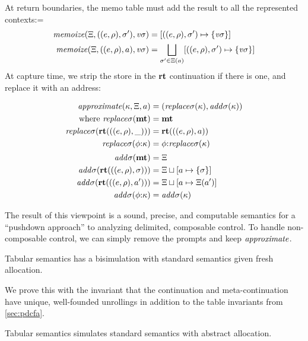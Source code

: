 At return boundaries, the memo table must add the result to all the represented contexts:=
\begin{align*}
  \mathit{memoize}(\Xi, ((e,\rho), \sigma'), \mathit{v\sigma}) &=
  [((e,\rho), \sigma') \mapsto \{ {\mathit{v\sigma}} \}] \\
  \mathit{memoize}(\Xi, ((e,\rho), a), \mathit{v\sigma}) &=
  \bigsqcup\limits_{\sigma' \in \Xi(a)}[((e,\rho), \sigma') \mapsto \{ \mathit{v\sigma} \}]
\end{align*}
At capture time, we strip the store in the $\mathbf{rt}$ continuation if there is one, and replace it with an address:

\newcommand{\replacectx}{\mathit{replace}\mstore}
\newcommand{\addstore}{\mathit{add}\mstore}
\begin{align*}
  \approximate(\mkont, \mktab, \maddr) &= (\replacectx(\mkont), \addstore(\mkont)) \\
  \text{where }
   \replacectx(\kmt) &= \kmt \\
   \replacectx(\krt{((\mexpr,\menv),\_)}) &= \krt{((\mexpr,\menv),\maddr)} \\
   \replacectx(\kcons{\mkframe}{\mkont}) &= \kcons{\mkframe}{\replacectx(\mkont)}
  \\[2pt]
   \addstore(\kmt) &= \mktab \\
   \addstore(\krt{((\mexpr,\menv),\mstore)}) &= \joinone{\mktab}{\maddr}{\mstore} \\
   \addstore(\krt{((\mexpr,\menv),\maddr')}) &= \joinm{\mktab}{\maddr}{\mktab(\maddr')} \\
   \addstore(\kcons{\mkframe}{\mkont}) &= \addstore(\mkont)
\end{align*}

The result of this viewpoint is a sound, precise, and computable semantics for a ``pushdown approach'' to analyzing delimited, composable control.
%
To handle non-composable control, we can simply remove the prompts and keep $\mathit{approximate}$.

\begin{conjecture}\label{thm:concrete-sr}
  Tabular semantics has a bisimulation with standard semantics given fresh allocation.
\end{conjecture}

We prove this with the invariant that the continuation and meta-continuation have unique, well-founded unrollings in addition to the table invariants from \autoref{sec:pdcfa}.

\begin{conjecture}\label{thm:sound-sr}
  Tabular semantics simulates standard semantics with abstract allocation.
\end{conjecture}

